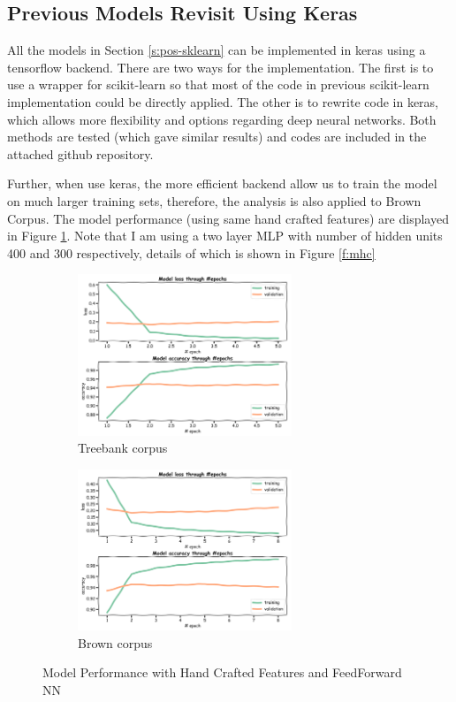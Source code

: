 \documentclass[11pt]{article}
\theoremstyle{plain}
\begin{document}
\subsection{Previous Models Revisit Using Keras}
All the models in Section \ref{s:pos-sklearn} can be implemented in keras 
using a tensorflow backend. There are two ways for the implementation. The 
first is to use a wrapper for scikit-learn so that most of the code in previous 
scikit-learn implementation could be directly applied. The other is to rewrite 
code in keras, which allows more flexibility and options regarding deep neural 
networks. Both methods are tested (which gave similar results) and codes 
are included in the attached github repository. 

Further, when use keras, the more efficient backend allow us to train the 
model on much larger training sets, therefore, the analysis is also applied to 
Brown Corpus. The model performance (using same hand crafted features) 
are displayed in Figure \ref{f:mphc}. Note that I am using a two layer MLP 
with number of hidden units 400 and 300 respectively, details of which is 
shown in Figure \ref{f:mhc}
\begin{figure}[!ht]
	\centering
	\begin{subfigure}[b]{0.5\textwidth}
		\includegraphics[height=1.9in]{images/model-performance-tree.png}
		\caption{Treebank corpus}
	\end{subfigure}%
	\begin{subfigure}[b]{0.5\textwidth}
		\includegraphics[height=1.9in]{images/model-performance-brown.png}
		\caption{Brown corpus}
	\end{subfigure}
	\caption{Model Performance with Hand Crafted Features and FeedForward 
	NN}\label{f:mphc}
\end{figure}
\end{document}
